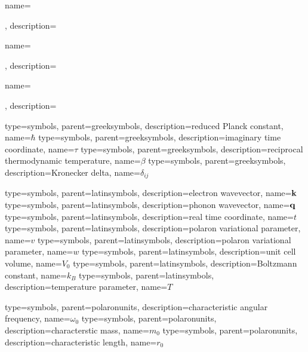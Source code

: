 
 {name={\parbox{\textwidth}{\aftsymbgroup}}, description={\nopostdesc}}
 {name={\parbox{\textwidth}{\aftsymbgroup}}, description={\nopostdesc}}
 {name={\parbox{\textwidth}{\aftsymbgroup}}, description={\nopostdesc}}



 {type=symbols, parent=greeksymbols, description={reduced Planck constant}, name={\ensuremath{\hbar}}}
 {type=symbols, parent=greeksymbols, description={imaginary time coordinate}, name={\ensuremath{\tau}}}
 {type=symbols, parent=greeksymbols, description={reciprocal thermodynamic temperature}, name={\ensuremath{\beta}}}
 {type=symbols, parent=greeksymbols, description={Kronecker delta}, name={\ensuremath{\delta_{ij}}}}

 {type=symbols, parent=latinsymbols, description={electron wavevector}, name={\ensuremath{\vb{k}}}}
 {type=symbols, parent=latinsymbols, description={phonon wavevector}, name={\ensuremath{\vb{q}}}}
 {type=symbols, parent=latinsymbols, description={real time coordinate}, name={\ensuremath{t}}}
 {type=symbols, parent=latinsymbols, description={polaron variational parameter}, name={\ensuremath{v}}}
 {type=symbols, parent=latinsymbols, description={polaron variational parameter}, name={\ensuremath{w}}}
 {type=symbols, parent=latinsymbols, description={unit cell volume}, name={\ensuremath{V_0}}}
 {type=symbols, parent=latinsymbols, description={Boltzmann constant}, name={\ensuremath{k_B}}}
 {type=symbols, parent=latinsymbols, description={temperature parameter}, name={\ensuremath{T}}}


 {type=symbols, parent=polaronunits, description={characteristic angular frequency}, name={\ensuremath{\omega_0}}}
 {type=symbols, parent=polaronunits, description={characterstic mass}, name={\ensuremath{m_0}}}
 {type=symbols, parent=polaronunits, description={characteristic length}, name={\ensuremath{r_0}}}
